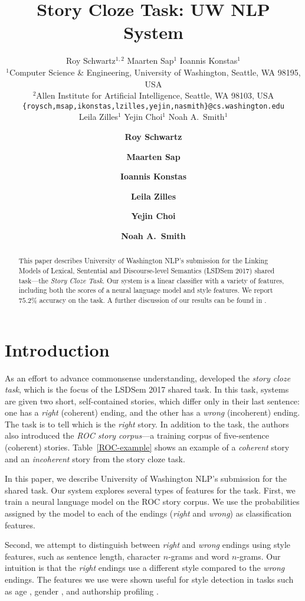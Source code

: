 \documentclass[11pt]{article}
\title{Story Cloze Task: UW NLP System}
\author{\hspace{2cm}Roy Schwartz$^{1,2}$ \And \hspace{2.5cm}Maarten Sap$^1$ \And \hspace{3cm}Ioannis Konstas$^1$ \And \\
  $^1$Computer Science \& Engineering, University of Washington,
  Seattle, WA 98195, USA \\
  $^2$Allen Institute for Artificial Intelligence, Seattle, WA 98103, USA \\
    {\tt \{roysch,msap,ikonstas,lzilles,yejin,nasmith\}@cs.washington.edu}  \\
    \And \hspace{-2cm}Leila Zilles$^1$ \And \hspace{-2.5cm}Yejin Choi$^1$ \And \hspace{-2.5cm}Noah A.~Smith$^1$ \\
  }
\author[1,2]{\bf Roy Schwartz}
\author[1]{\bf Maarten Sap}
\author[1]{\bf Ioannis Konstas}
\author[1]{\bf Leila Zilles}
\author[1]{\bf Yejin Choi}
\author[1]{\bf Noah A.~Smith}
\affil[1]{Computer Science \& Engineering, University of Washington, Seattle, WA 98195, USA}
\affil[2]{Allen Institute for Artificial Intelligence, Seattle, WA 98103, USA}
\affil[  ]{\tt \{roysch,msap,ikonstas,lzilles,yejin,nasmith\}@cs.washington.edu}
\date{}
\newcommand{\ms}[1]{{\color{cyan}\{\textit{#1}\}$_{ms}$}}
\newcommand{\tabref}[1]{Table~\ref{#1}}
\begin{document}
\maketitle
\begin{abstract} %
This paper describes University of Washington NLP's submission for the Linking Models of Lexical, Sentential and Discourse-level Semantics (LSDSem 2017) shared task---the \textit{Story Cloze Task}.
Our system is a linear classifier with a variety of features, including both the scores of a neural language model and style features.
We report  $75.2\%$ accuracy on the task. 
A further discussion of our results can be found in .
\end{abstract}

\section{Introduction}
As an effort to advance commonsense  understanding,  developed the \textit{story cloze task}, which is the focus of the LSDSem 2017 shared task. 
In this task, systems are given two short, self-contained stories, which differ only in their last sentence: 
one has a {\it right} (coherent) ending, and the other has a {\it wrong} (incoherent) ending.
The task is to tell which is the {\it right} story.
In addition to the task, the authors also introduced the {\it ROC story corpus}---a training corpus of five-sentence (coherent) stories. 
\tabref{ROC-example} shows an example of a {\it coherent} story and an {\it incoherent} story from the story cloze task.


In this paper, we describe University of Washington NLP's submission for the shared task.
Our system explores several types of features for the task.
First, we train a neural language model \cite{mikolov2010recurrent} on the ROC story corpus. 
We use the probabilities assigned by the model to each of the endings ({\it right} and {\it wrong}) as classification features.

Second, we attempt to distinguish between {\it right} and {\it wrong} endings using style features, such as sentence length, character $n$-grams and word $n$-grams. 
Our intuition is that the {\it right} endings use a different style compared to the {\it wrong} endings.
The features we use were shown useful for style detection in tasks such as age \cite{Schler:2006}, gender \cite{Argamon:2003}, 
and authorship profiling \cite{Stamatatos:2009}.
\end{document}
